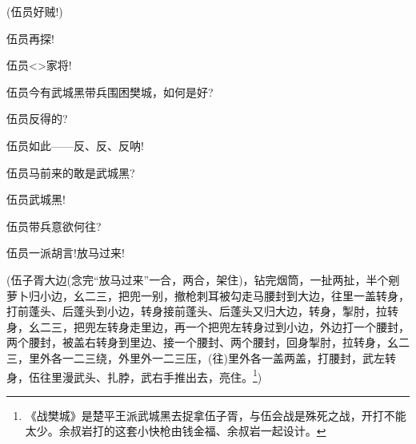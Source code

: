 {(伍员\hspace{30pt}好贼!)


伍员\hspace{30pt}再探!

伍员\hspace{30pt}\textless{}\!\textgreater{}家将!

伍员\hspace{30pt}今有武城黑带兵围困樊城，如何是好?

伍员\hspace{30pt}反得的?

伍员\hspace{30pt}如此------反、反、反呐!




\vspace{5pt}

伍员\hspace{30pt}马前来的敢是武城黑?

伍员\hspace{30pt}武城黑!

伍员\hspace{30pt}带兵意欲何往?

伍员\hspace{30pt}一派胡言!放马过来!

(伍子胥{\hwfs 大边}({\hwfs 念完}``{放马过来}''{\hwfs 一合}，{\hwfs 两合}，{\hwfs 架住})，{\hwfs 钻完烟筒}，{\hwfs 一扯两扯}，{\hwfs 半个剜萝卜归小边}，{\hwfs 幺二三}，{\hwfs 把兜一别}，{\hwfs 撤枪刺耳被勾走马腰封到大边}，{\hwfs 往里一盖转身}，{\hwfs 打前蓬头}、{\hwfs 后蓬头到小边}，{\hwfs 转身接前蓬头}、{\hwfs 后蓬头又归大边}，{\hwfs 转身}，{\hwfs 掣肘}，{\hwfs 拉转身}，{\hwfs 幺二三}，{\hwfs 把兜左转身走里边}，{\hwfs 再一个把兜左转身过到小边}，{\hwfs 外边打一个腰封}，{\hwfs 两个腰封}，{\hwfs 被盖右转身到里边}、{\hwfs 接一个腰封}、{\hwfs 两个腰封}，{\hwfs 回身掣肘}，{\hwfs 拉转身}，{\hwfs 幺二三}，{\hwfs 里外各一二三绕}，{\hwfs 外里外一二三压}，({\hwfs 往}){\hwfs 里外各一盖两盖}，{\hwfs 打腰封}，武{\hwfs 左转身}，伍{\hwfs 往里漫}武{\hwfs 头}、{\hwfs 扎脖}，武{\hwfs 右手推出去}，{\hwfs 亮住}。\footnote{ {《战樊城》是楚平王派武城黑去捉拿伍子胥}，{与伍会战是殊死之战}，{开打不能太少}。{余叔岩打的这套小快枪由钱金福、余叔岩一起设计。}})

}
